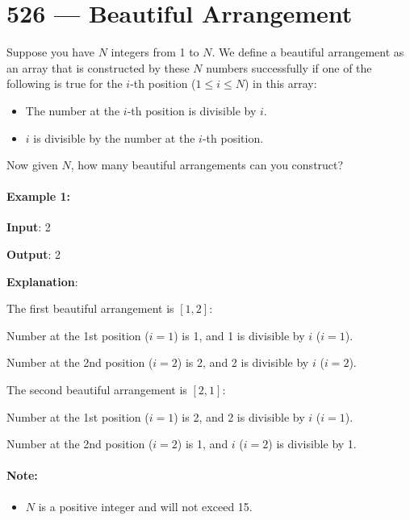 \section{526 --- Beautiful Arrangement}
Suppose you have $ N $ integers from 1 to $N$. We define a beautiful arrangement as an array that is constructed by these $ N $ numbers successfully if one of the following is true for the $ i $-th position ($1 \leq i \leq N$) in this array:

 \begin{itemize}
\item The number at the $ i $-th position is divisible by $ i $.
\item $ i $ is divisible by the number at the $ i $-th position.

\end{itemize}
 

Now given $N$, how many beautiful arrangements can you construct?

\paragraph{Example 1:}

\begin{flushleft}
\textbf{Input}: 2

\textbf{Output}: 2

\textbf{Explanation}: 

The first beautiful arrangement is $[1, 2]$:

Number at the 1st position ($ i=1 $) is 1, and 1 is divisible by $ i $ ($ i=1 $).

Number at the 2nd position ($ i=2 $) is 2, and 2 is divisible by $ i $ ($ i=2 $).

The second beautiful arrangement is $ [2, 1] $:

Number at the 1st position ($ i=1 $) is 2, and 2 is divisible by $ i $ ($ i=1 $).

Number at the 2nd position ($ i=2 $) is 1, and $ i $ ($ i=2 $) is divisible by 1.

 
\end{flushleft}

\paragraph{Note:}

\begin{itemize}
\item  $ N $ is a positive integer and will not exceed 15.
\end{itemize}

